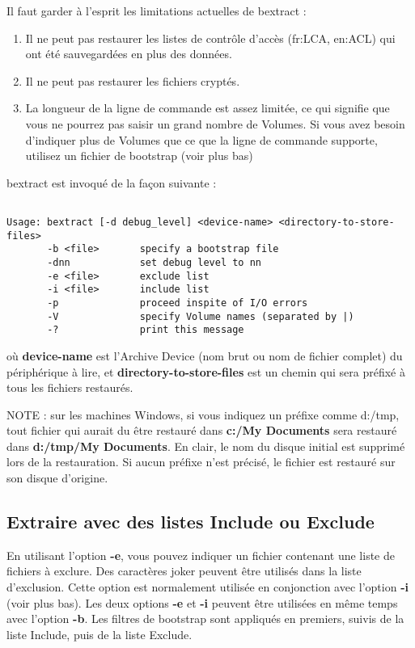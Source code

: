 Il faut garder à l'esprit les limitations actuelles de bextract :

\begin{enumerate}
\item Il ne peut pas restaurer les listes de contrôle d'accès (fr:LCA, en:ACL)
      qui ont été sauvegardées en plus des données.
\item Il ne peut pas restaurer les fichiers cryptés.
\item La longueur de la ligne de commande est assez limitée, ce qui signifie
      que vous ne pourrez pas saisir un grand nombre de Volumes. Si vous avez
      besoin d'indiquer plus de Volumes que ce que la ligne de commande
      supporte, utilisez un fichier de bootstrap (voir plus bas)
\end{enumerate}

bextract est invoqué de la façon suivante : 

\footnotesize
\begin{verbatim}
 
Usage: bextract [-d debug_level] <device-name> <directory-to-store-files>
       -b <file>       specify a bootstrap file
       -dnn            set debug level to nn
       -e <file>       exclude list
       -i <file>       include list
       -p              proceed inspite of I/O errors
       -V              specify Volume names (separated by |)
       -?              print this message
\end{verbatim}
\normalsize

où {\bf device-name} est l'Archive Device (nom brut ou nom de fichier complet) 
du périphérique à lire, et {\bf directory-to-store-files} est un chemin qui sera
préfixé à tous les fichiers restaurés.

NOTE : sur les machines Windows, si vous indiquez un préfixe comme d:/tmp, tout
fichier qui aurait du être restauré dans {\bf c:/My Documents} sera restauré
dans {\bf d:/tmp/My Documents}. En clair, le nom du disque initial est supprimé
lors de la restauration. Si aucun préfixe n'est précisé, le fichier est
restauré sur son disque d'origine.

\subsection{Extraire avec des listes Include ou Exclude}

En utilisant l'option {\bf -e}, vous pouvez indiquer un fichier contenant une
liste de fichiers à exclure. Des caractères joker peuvent être utilisés dans la
liste d'exclusion. Cette option est normalement utilisée en conjonction avec
l'option {\bf -i} (voir plus bas). Les deux options {\bf -e} et {\bf -i} peuvent
être utilisées en même temps avec l'option {\bf -b}. Les filtres de bootstrap
sont appliqués en premiers, suivis de la liste Include, puis de la liste 
Exclude.

